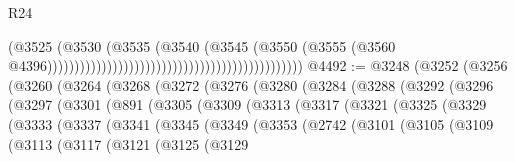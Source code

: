 \begin{lexlean}{R24}
\begin{coremodule}
                                                                                  (@3525
                                                                                    (@3530
                                                                                      (@3535
                                                                                        (@3540
                                                                                          (@3545
                                                                                            (@3550
                                                                                              (@3555
                                                                                                (@3560
                                                                                                  @4396)))))))))))))))))))))))))))))))))))))))))))))))
@4492 := @3248
    (@3252
      (@3256
        (@3260
          (@3264
            (@3268
              (@3272
                (@3276
                  (@3280
                    (@3284
                      (@3288
                        (@3292
                          (@3296
                            (@3297
                              (@3301
                                (@891
                                  (@3305
                                    (@3309
                                      (@3313
                                        (@3317
                                          (@3321
                                            (@3325
                                              (@3329
                                                (@3333
                                                  (@3337
                                                    (@3341
                                                      (@3345
                                                        (@3349
                                                          (@3353
                                                            (@2742
                                                              (@3101
                                                                (@3105
                                                                  (@3109
                                                                    (@3113
                                                                      (@3117
                                                                        (@3121
                                                                          (@3125
                                                                            (@3129

\end{coremodule}
\end{lexlean}
